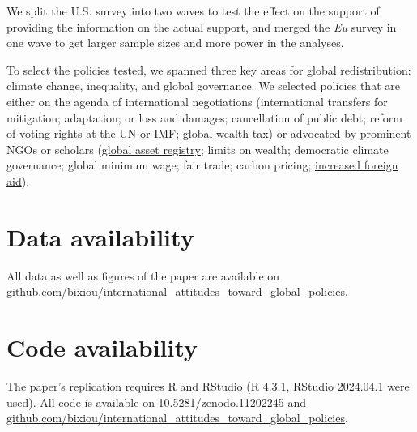 \begin{small}
We split the U.S. survey into two waves to test the effect on the support of providing the information on the actual support, and merged the \textit{Eu} survey in one wave to get larger sample sizes and more power in the analyses. 

To select the policies tested, we spanned three key areas for global redistribution: climate change, inequality, and global governance. We selected policies that are either on the agenda of international negotiations (international transfers for mitigation; adaptation; or loss and damages; cancellation of public debt; reform of voting rights at the UN or IMF; global wealth tax) or advocated by prominent NGOs or scholars (\href{https://static1.squarespace.com/static/5a0c602bf43b5594845abb81/t/5c988368eef1a1538c2ae7eb/1553498989927/GAR.pdf}{global asset registry}; limits on wealth;\citep{robeyns_limitarianism_2024,piketty_brief_2022} democratic climate governance;\citep{dryzek_global_2011} global minimum wage;\citep{palley_financial_2013} fair trade;\citep{hickel_divide_2017} carbon pricing;\citep{cramton_global_2017} \href{https://concordeurope.org/wp-content/uploads/2019/11/CONCORD_AidWatch_Report_2019_web.pdf}{increased foreign aid}).



\section*{\normalsize Data availability}

All data as well as figures of the paper are available on \href{https://github.com/bixiou/international_attitudes_toward_global_policies}{github.com/bixiou/international\_attitudes\_toward\_global\_policies}. 

\section*{\normalsize Code availability}

The paper's replication requires R and RStudio (R 4.3.1, RStudio 2024.04.1 were used). All code is available on \href{https://zenodo.org/doi/10.5281/zenodo.11202245}{10.5281/zenodo.11202245} and \href{https://github.com/bixiou/international_attitudes_toward_global_policies}{github.com/bixiou/international\_attitudes\_toward\_global\_policies}. %


\end{small}
